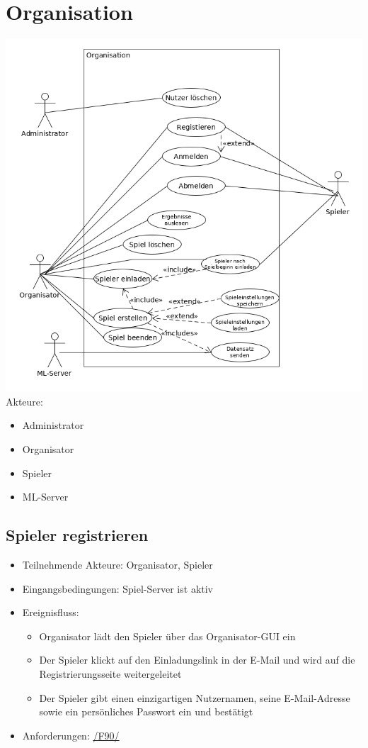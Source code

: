 \documentclass[a4paper]{scrreprt}
\begin{document}
    \section{Organisation}
    \includegraphics[width=\textwidth]{uml/export/Organisation.png}
    Akteure:
    \begin{itemize}
        \item \Gls{Administrator}
        \item \Gls{Organisator}
        \item \Gls{Spieler}
        \item \Gls{ML-Server}
    \end{itemize}
    \newpage
   \subsection{Spieler registrieren}
    \begin{itemize}
        \item Teilnehmende Akteure: \Gls{Organisator}, \Gls{Spieler}
        \item Eingangsbedingungen: \Gls{Spiel-Server} ist aktiv
        \item Ereignisfluss:
        \begin{itemize}
            \item \Gls{Organisator} lädt den \Gls{Spieler} über das Organisator-GUI ein
            \item Der \Gls{Spieler} klickt auf den Einladungslink in der E-Mail und wird auf die Registrierungsseite weitergeleitet
            \item Der \Gls{Spieler} gibt einen einzigartigen Nutzernamen, seine E-Mail-Adresse sowie ein persönliches Passwort ein und bestätigt
        \end{itemize}
        \item Anforderungen: \hyperlink{F90}{/F90/}
    \end{itemize}
\end{document}
